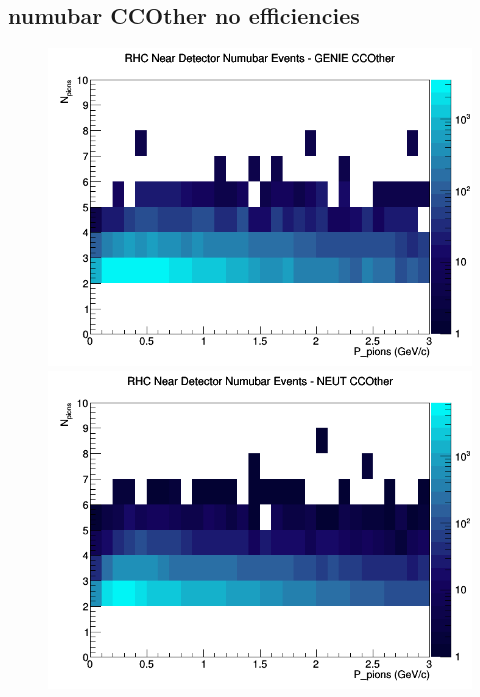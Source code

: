\documentclass[12pt]{article}
\begin{document}
\subsection{numubar CCOther no efficiencies}
\begin{figure}[h]
\includegraphics[width=\linewidth]{N_P/nominal/pions/CCOther_RHC_ND_numubar_N_P_GENIE.png}
\endminipage
{}
\includegraphics[width=\linewidth]{N_P/nominal/pions/CCOther_RHC_ND_numubar_N_P_NEUT.png}
\endminipage
{}

\end{figure}
\end{document}

